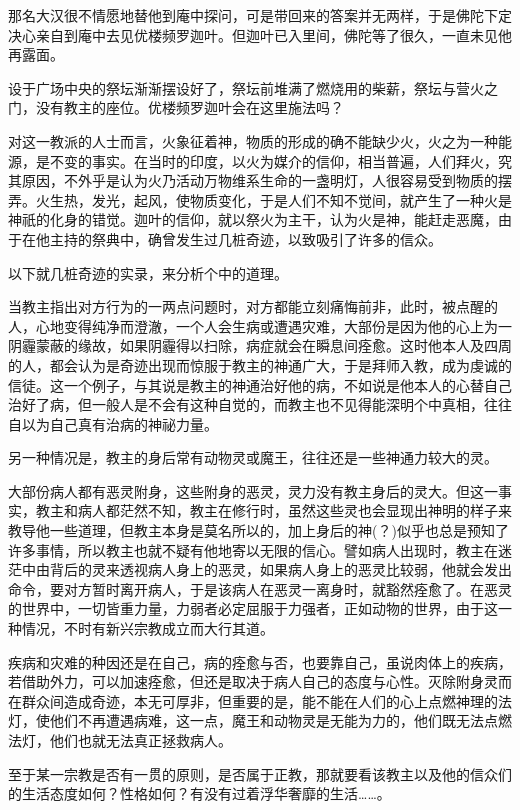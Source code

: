 \documentclass[twoside,openany]{book}
\begin{document}
那名大汉很不情愿地替他到庵中探问，可是带回来的答案并无两样，于是佛陀下定决心亲自到庵中去见优楼频罗迦叶。但迦叶已入里间，佛陀等了很久，一直未见他再露面。

设于广场中央的祭坛渐渐摆设好了，祭坛前堆满了燃烧用的柴薪，祭坛与营火之门，没有教主的座位。优楼频罗迦叶会在这里施法吗？

对这一教派的人士而言，火象征着神，物质的形成的确不能缺少火，火之为一种能源，是不变的事实。在当时的印度，以火为媒介的信仰，相当普遍，人们拜火，究其原因，不外乎是认为火乃活动万物维系生命的一盏明灯，人很容易受到物质的摆弄。火生热，发光，起风，使物质变化，于是人们不知不觉间，就产生了一种火是神祇的化身的错觉。迦叶的信仰，就以祭火为主干，认为火是神，能赶走恶魔，由于在他主持的祭典中，确曾发生过几桩奇迹，以致吸引了许多的信众。

以下就几桩奇迹的实录，来分析个中的道理。

当教主指出对方行为的一两点问题时，对方都能立刻痛悔前非，此时，被点醒的人，心地变得纯净而澄澈，一个人会生病或遭遇灾难，大部份是因为他的心上为一阴霾蒙蔽的缘故，如果阴霾得以扫除，病症就会在瞬息间痊愈。这时他本人及四周的人，都会认为是奇迹出现而惊服于教主的神通广大，于是拜师入教，成为虔诚的信徒。这一个例子，与其说是教主的神通治好他的病，不如说是他本人的心替自己治好了病，但一般人是不会有这种自觉的，而教主也不见得能深明个中真相，往往自以为自己真有治病的神祕力量。

另一种情况是，教主的身后常有动物灵或魔王，往往还是一些神通力较大的灵。

大部份病人都有恶灵附身，这些附身的恶灵，灵力没有教主身后的灵大。但这一事实，教主和病人都茫然不知，教主在修行时，虽然这些灵也会显现出神明的样子来教导他一些道理，但教主本身是莫名所以的，加上身后的神(？)似乎也总是预知了许多事情，所以教主也就不疑有他地寄以无限的信心。譬如病人出现时，教主在迷茫中由背后的灵来透视病人身上的恶灵，如果病人身上的恶灵比较弱，他就会发出命令，要对方暂时离开病人，于是该病人在恶灵一离身时，就豁然痊愈了。在恶灵的世界中，一切皆重力量，力弱者必定屈服于力强者，正如动物的世界，由于这一种情况，不时有新兴宗教成立而大行其道。

疾病和灾难的种因还是在自己，病的痊愈与否，也要靠自己，虽说肉体上的疾病，若借助外力，可以加速痊愈，但还是取决于病人自己的态度与心性。灭除附身灵而在群众间造成奇迹，本无可厚非，但重要的是，能不能在人们的心上点燃神理的法灯，使他们不再遭遇病难，这一点，魔王和动物灵是无能为力的，他们既无法点燃法灯，他们也就无法真正拯救病人。

至于某一宗教是否有一贯的原则，是否属于正教，那就要看该教主以及他的信众们的生活态度如何？性格如何？有没有过着浮华奢靡的生活……。
\end{document}

